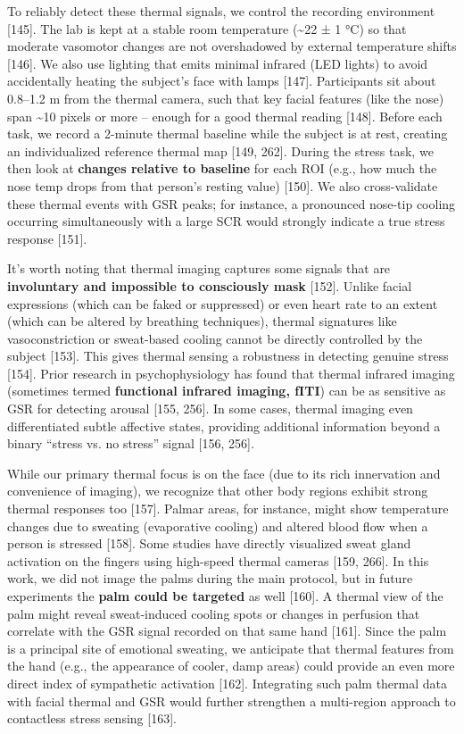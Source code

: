 \documentclass{article}
\begin{document}
    To reliably detect these thermal signals, we control the recording environment [145]. The lab is kept at a stable room temperature (\textasciitilde22 ± 1 °C) so that moderate vasomotor changes are not overshadowed by external temperature shifts [146]. We also use lighting that emits minimal infrared (LED lights) to avoid accidentally heating the subject’s face with lamps [147]. Participants sit about 0.8–1.2 m from the thermal camera, such that key facial features (like the nose) span \textasciitilde10 pixels or more – enough for a good thermal reading [148]. Before each task, we record a 2-minute thermal baseline while the subject is at rest, creating an individualized reference thermal map [149, 262]. During the stress task, we then look at \textbf{changes relative to baseline} for each ROI (e.g., how much the nose temp drops from that person’s resting value) [150]. We also cross-validate these thermal events with GSR peaks; for instance, a pronounced nose-tip cooling occurring simultaneously with a large SCR would strongly indicate a true stress response [151].

    It’s worth noting that thermal imaging captures some signals that are \textbf{involuntary and impossible to consciously mask} [152]. Unlike facial expressions (which can be faked or suppressed) or even heart rate to an extent (which can be altered by breathing techniques), thermal signatures like vasoconstriction or sweat-based cooling cannot be directly controlled by the subject [153]. This gives thermal sensing a robustness in detecting genuine stress [154]. Prior research in psychophysiology has found that thermal infrared imaging (sometimes termed \textbf{functional infrared imaging, fITI}) can be as sensitive as GSR for detecting arousal [155, 256]. In some cases, thermal imaging even differentiated subtle affective states, providing additional information beyond a binary “stress vs. no stress” signal [156, 256].

    While our primary thermal focus is on the face (due to its rich innervation and convenience of imaging), we recognize that other body regions exhibit strong thermal responses too [157]. Palmar areas, for instance, might show temperature changes due to sweating (evaporative cooling) and altered blood flow when a person is stressed [158]. Some studies have directly visualized sweat gland activation on the fingers using high-speed thermal cameras [159, 266]. In this work, we did not image the palms during the main protocol, but in future experiments the \textbf{palm could be targeted} as well [160]. A thermal view of the palm might reveal sweat-induced cooling spots or changes in perfusion that correlate with the GSR signal recorded on that same hand [161]. Since the palm is a principal site of emotional sweating, we anticipate that thermal features from the hand (e.g., the appearance of cooler, damp areas) could provide an even more direct index of sympathetic activation [162]. Integrating such palm thermal data with facial thermal and GSR would further strengthen a multi-region approach to contactless stress sensing [163].
\end{document}
